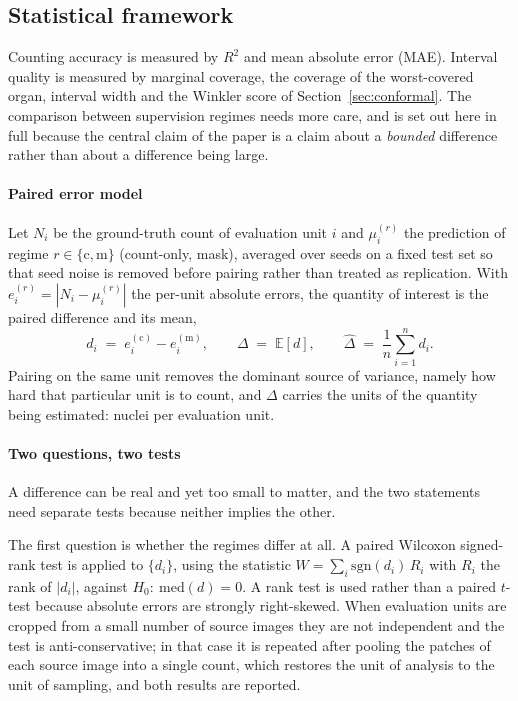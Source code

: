 \documentclass[preprint,12pt]{elsarticle}
\begin{document}
\subsection{Statistical framework}\label{sec:stats}

Counting accuracy is measured by $R^2$ and mean absolute error (MAE). Interval quality is measured by marginal
coverage, the coverage of the worst-covered organ, interval width and the Winkler score of
Section~\ref{sec:conformal}. The comparison between supervision regimes needs more care, and is set out here in
full because the central claim of the paper is a claim about a \emph{bounded} difference rather than about a
difference being large.

\paragraph{Paired error model} Let $N_i$ be the ground-truth count of evaluation unit $i$ and $\mu_i^{(r)}$
the prediction of regime $r \in \{\mathrm{c},\mathrm{m}\}$ (count-only, mask), averaged over seeds on a fixed
test set so that seed noise is removed before pairing rather than treated as replication. With
$e_i^{(r)} = |N_i - \mu_i^{(r)}|$ the per-unit absolute errors, the quantity of interest is the paired
difference and its mean,
\begin{equation}
d_i \;=\; e_i^{(\mathrm{c})} - e_i^{(\mathrm{m})}, \qquad
\Delta \;=\; \mathbb{E}[d], \qquad
\hat{\Delta} \;=\; \frac{1}{n}\sum_{i=1}^{n} d_i .
\end{equation}
Pairing on the same unit removes the dominant source of variance, namely how hard that particular unit is to
count, and $\Delta$ carries the units of the quantity being estimated: nuclei per evaluation unit.

\paragraph{Two questions, two tests} A difference can be real and yet too small to matter, and the two
statements need separate tests because neither implies the other.

The first question is whether the regimes differ at all. A paired Wilcoxon signed-rank test is applied to
$\{d_i\}$, using the statistic $W = \sum_i \mathrm{sgn}(d_i)\,R_i$ with $R_i$ the rank of $|d_i|$, against
$H_0:\ \mathrm{med}(d) = 0$. A rank test is used rather than a paired $t$-test because absolute errors are
strongly right-skewed. When evaluation units are cropped from a small number of source images they are not
independent and the test is anti-conservative; in that case it is repeated after pooling the patches of each
source image into a single count, which restores the unit of analysis to the unit of sampling, and both results
are reported.
\end{document}
